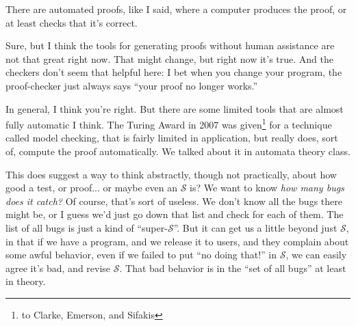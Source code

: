 \documentclass[sigplan]{acmart}
\begin{document}
 There are automated proofs, like I said,
where a
computer produces the proof, or at least checks that it's correct.

 Sure, but I think the tools for generating
proofs without human assistance are not that great right now.  That
might change, but right now it's true.  And the checkers don't seem
that helpful here:  I bet when you change your program, the
proof-checker just always says ``your proof no longer works.''


\vspace{0.1in}
\vspace{0.1in}

   In general, I think you're right. But
there are some limited tools that are almost fully automatic I think.
The Turing Award in 2007 was given\footnote{to Clarke, Emerson, and
  Sifakis} for a technique called model
checking, that is fairly limited in application, but really does, sort of,
compute the proof automatically.  We talked about it in automata
theory class.

  This does suggest a way to think
abstractly, though not practically, about how good a test, or proof...
or maybe even an $\mathcal{S}$ is?  We want to know \emph{how many bugs does
  it catch?}  Of course, that's sort of useless.  We don't know all
the bugs there might be, or I guess we'd just go down that list and
check for each of them.  The list of all bugs is just a kind of ``super-$\mathcal{S}$''.  But it can get us a little beyond just
$\mathcal{S}$, in that if we have a program, and we release it to
users, and they complain about some awful behavior, even if we failed
to put ``no doing that!'' in $\mathcal{S}$, we can easily agree it's
bad, and revise $\mathcal{S}$.  That bad behavior is in the ``set of
all bugs'' at least in theory.
\end{document}
